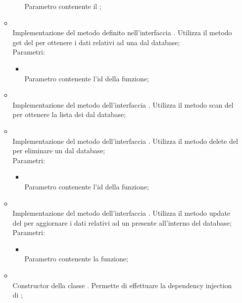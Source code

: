 \begin{itemize}
\begin{itemize}
\begin{itemize}
			Parametro contenente il ;
		\end{itemize}
		\item[]  \\		Implementazione del metodo definito nell'interfaccia . Utilizza il metodo get del  per ottenere i dati relativi ad una  dal database;\\
		Parametri:
		\begin{itemize}
			\item {} \\
			Parametro contenente l'id della funzione;
		\end{itemize}
		\item[]  \\		Implementazione del metodo dell'interfaccia . Utilizza il metodo scan del \\  per ottenere la lista dei  dal database;\\
		\item[]  \\		Implementazione del metodo dell'interfaccia . Utilizza il metodo delete del  per eliminare un  dal database;\\
		Parametri:
		\begin{itemize}
			\item {} \\
			Parametro contenente l'id della funzione;
		\end{itemize}
		\item[]  \\		Implementazione del metodo dell'interfaccia . Utilizza il metodo update del  per aggiornare i dati relativi ad un  presente all'interno del database;\\
		Parametri:
		\begin{itemize}
			\item {} \\
			Parametro contenente la funzione;
		\end{itemize}
		\item[]  \\		Constructor della classe . Permette di effettuare la dependency injection di ;\\

\end{itemize}
\end{itemize}
